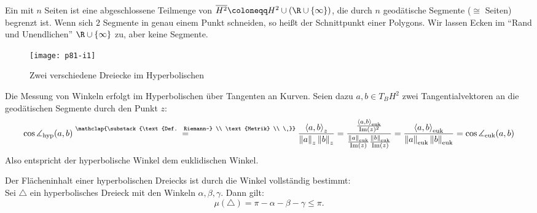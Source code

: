 \begin{definition}
  Ein  mit \( n \) Seiten ist eine abgeschlossene Teilmenge von \( \overline{H^2} \coloneqq H^2 \cup \left( \R \cup \left \{ \infty \right \} \right) \), die durch \( n \) geodätische Segmente (\( \cong \) Seiten) begrenzt ist. Wenn sich \( 2 \) Segmente in genau einem Punkt schneiden, so heißt der Schnittpunkt  einer Polygons. Wir lassen Ecken im ``Rand und Unendlichen'' \( \R \cup \left \{ \infty \right \} \) zu, aber keine Segmente.
  \begin{figure}[H]
    \texttt{[image: p81-i1]}
    \caption{Zwei verschiedene Dreiecke im Hyperbolischen}
  \end{figure}
\end{definition}

\begin{remark}
  Die Messung von Winkeln erfolgt im Hyperbolischen über Tangenten an Kurven. Seien dazu \( a, b \in T_B H^2 \) zwei Tangentialvektoren an die geodätischen Segmente durch den Punkt \( z \):
  \begin{equation*}
    \cos \measuredangle_\text{hyp}(a,b) \overset{\mathclap{\substack{\text{Def. Riemann-} \\ \text{Metrik} \\ \ }}}{=} \frac{\left\langle a,b \right\rangle_z}{\left\Vert a \right\Vert_z \left\Vert b \right\Vert_z} = \frac{\frac{\left\langle a,b \right\rangle_\text{euk}}{\text{Im}(z)^2}}{\frac{\left\Vert a \right\Vert_{\text{euk}}}{\text{Im}(z)} \frac{\left\Vert b \right\Vert_{\text{euk}}}{\text{Im}(z)}} = \frac{\left\langle a,b \right\rangle_\text{euk}}{\left\Vert a \right\Vert_\text{euk} \left\Vert b \right\Vert_\text{euk}} = \cos \measuredangle_\text{euk}(a,b)
  \end{equation*}
  Also entspricht der hyperbolische Winkel dem euklidischen Winkel.
\end{remark}

\begin{theorem}
  Der Flächeninhalt einer hyperbolischen Dreiecks ist durch die Winkel vollständig bestimmt: \\
  Sei \( \triangle \) ein hyperbolisches Dreieck mit den Winkeln \( \alpha, \beta, \gamma \). Dann gilt:
  \begin{equation*}
    \mu(\triangle) = \pi - \alpha - \beta - \gamma \leq \pi\text{.}
  \end{equation*}
\end{theorem}

